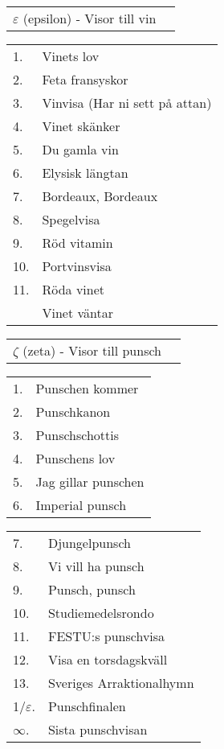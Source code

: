 \documentclass[a6paper,10pt]{article}
\begin{document}
\vspace{-5pt}

\vspace{-10pt}
\begin{table}[!ht]
\begin{tabularx}{1\textwidth}{l X}
\Large $\varepsilon$ (epsilon) - Visor till vin&\\
\end{tabularx}
\end{table}
\begin{table}[!ht]
\begin{tabularx}{1\textwidth}{l X}
1.&Vinets lov\\
2.&Feta fransyskor\\
3.&Vinvisa (Har ni sett på attan)\\
4.&Vinet skänker\\
5.&Du gamla vin\\
6.&Elysisk längtan\\
7.&Bordeaux, Bordeaux\\
8.&Spegelvisa\\
9.&Röd vitamin\\
10.&Portvinsvisa\\
11.&Röda vinet\\
&Vinet väntar
\end{tabularx}
\end{table}
\begin{table}[!ht]
\begin{tabularx}{1\textwidth}{l X}
\Large $\zeta$ (zeta) - Visor till punsch&
\end{tabularx}
\end{table}
\begin{table}[!ht]
\begin{tabularx}{1\textwidth}{l X}
1.&Punschen kommer\\
2.&Punschkanon\\
3.&Punschschottis\\
4.&Punschens lov\\
5.&Jag gillar punschen\\
6.&Imperial punsch
\end{tabularx}
\end{table}
\begin{table}[!ht]
\begin{tabularx}{1\textwidth}{l X}
7.&Djungelpunsch\\
8.&Vi vill ha punsch\\
9.&Punsch, punsch\\
10.&Studiemedelsrondo\\
11.&FESTU:s punschvisa\\
12.&Visa en torsdagskväll\\
13.&Sveriges Arraktionalhymn\\
1/$\varepsilon$.&Punschfinalen\\
$\infty$.&Sista punschvisan
\end{tabularx}
\end{table}
\end{document}
